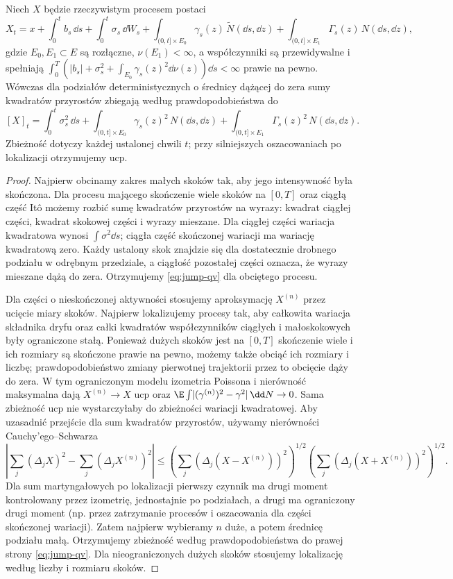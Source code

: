 \begin{twierdzenie}
\label{th:jump-qv}
Niech $X$ będzie rzeczywistym procesem postaci
\[
X_t=x+\int_0^t b_s\,\dd s+\int_0^t\sigma_s\,\dd W_s
+\int_{(0,t]\times E_0}\gamma_s(z)\,\widetilde N(\dd s,\dd z)
+\int_{(0,t]\times E_1}\Gamma_s(z)\,N(\dd s,\dd z),
\]
gdzie $E_0,E_1\subset E$ są rozłączne,
$\nu(E_1)<\infty$, a współczynniki są przewidywalne i spełniają
$\int_0^T(|b_s|+\sigma_s^2+\int_{E_0}\gamma_s(z)^2\dd\nu(z))\dd s
<\infty$ prawie na pewno.
Wówczas dla podziałów deterministycznych o średnicy dążącej
do zera sumy kwadratów przyrostów zbiegają według
prawdopodobieństwa do
\[
[X]_t=\int_0^t\sigma_s^2\,\dd s
+\int_{(0,t]\times E_0}\gamma_s(z)^2\,N(\dd s,\dd z)
+\int_{(0,t]\times E_1}\Gamma_s(z)^2\,N(\dd s,\dd z).
\tag{12.2}\label{eq:jump-qv}
\]
Zbieżność dotyczy każdej ustalonej chwili $t$; przy
silniejszych oszacowaniach po lokalizacji otrzymujemy ucp.
\end{twierdzenie}
\begin{proof}
Najpierw obcinamy zakres małych skoków tak, aby jego
intensywność była skończona. Dla procesu mającego
skończenie wiele skoków na $[0,T]$ oraz ciągłą część
Itô możemy rozbić sumę kwadratów przyrostów na
wyrazy: kwadrat ciągłej części, kwadrat skokowej
części i wyrazy mieszane. Dla ciągłej części
wariacja kwadratowa wynosi $\int\sigma^2\dd s$;
ciągła część skończonej wariacji ma wariację kwadratową
zero. Każdy ustalony skok znajdzie się dla dostatecznie
drobnego podziału w odrębnym przedziale, a ciągłość
pozostałej części oznacza, że wyrazy mieszane dążą do
zera. Otrzymujemy \eqref{eq:jump-qv} dla obciętego procesu.

Dla części o nieskończonej aktywności stosujemy
aproksymację $X^{(n)}$ przez ucięcie miary skoków.
Najpierw lokalizujemy procesy tak, aby całkowita wariacja
składnika dryfu oraz całki kwadratów współczynników
ciągłych i małoskokowych były ograniczone stałą. Ponieważ
dużych skoków jest na $[0,T]$ skończenie wiele i ich rozmiary
są skończone prawie na pewno, możemy także obciąć ich
rozmiary i liczbę; prawdopodobieństwo zmiany pierwotnej
trajektorii przez to obcięcie dąży do zera. W tym
ograniczonym modelu izometria Poissona i nierówność maksymalna
dają $X^{(n)}\to X$ ucp oraz
$\E\int\!|(\gamma^{(n)})^2-\gamma^2|\,\dd N\to0$.
Sama zbieżność ucp nie wystarczyłaby do zbieżności wariacji
kwadratowej. Aby uzasadnić przejście dla sum kwadratów
przyrostów, używamy nierówności Cauchy'ego--Schwarza
\[
\left|\sum_j(\Delta_jX)^2-\sum_j(\Delta_jX^{(n)})^2\right|
\le\left(\sum_j(\Delta_j(X-X^{(n)}))^2\right)^{1/2}
\left(\sum_j(\Delta_j(X+X^{(n)}))^2\right)^{1/2}.
\]
Dla sum martyngałowych po lokalizacji pierwszy czynnik
ma drugi moment kontrolowany przez izometrię, jednostajnie
po podziałach, a drugi ma ograniczony drugi moment
(np. przez zatrzymanie procesów i oszacowania dla części
skończonej wariacji). Zatem najpierw wybieramy $n$ duże,
a potem średnicę podziału małą. Otrzymujemy zbieżność
według prawdopodobieństwa do prawej strony
\eqref{eq:jump-qv}. Dla nieograniczonych dużych skoków
stosujemy lokalizację według liczby i rozmiaru skoków.
\end{proof}

